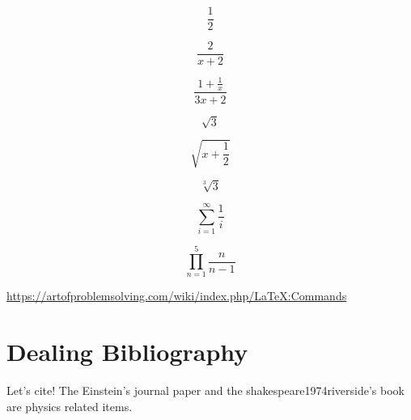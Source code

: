 \documentclass{article}
\begin{document}
\[ \frac12 \]

\[ \frac{2}{x+2} \]

\[ \frac{1+\frac{1}{x}}{3x + 2} \]

\[ \sqrt{3} \]

\[ \sqrt{x+\frac{1}{2}} \]

\[ \sqrt[3]{3} \]

\[ \sum_{i=1}^{\infty}\frac{1}{i} \]

\[ \prod_{n=1}^5\frac{n}{n-1} \]

\url{https://artofproblemsolving.com/wiki/index.php/LaTeX:Commands}

\section{Dealing Bibliography}
Let's cite! The Einstein's journal paper \cite{einstein} and the shakespeare1974riverside's book \cite{shakespeare1974riverside} are physics related items. 

\printbibliography[heading=bibintoc,
title={Bibliography Reference}]
\end{document}
